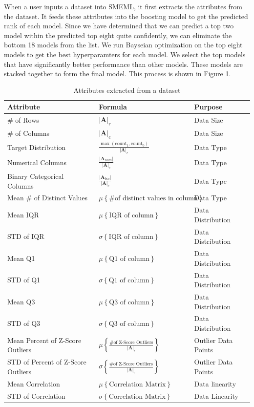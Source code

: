 \documentclass{article}
\begin{document}
When a user inputs a dataset into SMEML, it first extracts the attributes from the dataset. It feeds these attributes into the boosting model to get the predicted rank of each model. Since we have determined that we can predict a top two model within the predicted top eight quite confidently, we can eliminate the bottom 18 models from the list. We run Bayseian optimization on the top eight models to get the best hyperparamters for each model. We select the top models that have significantly better performance than other models. These models are stacked together to form the final model. This process is shown in Figure 1.
\begin{table}
  \caption{Attributes extracted from a dataset}
  \label{model-options-table}
  \centering
  \begin{tabular}{lll}
    \toprule
    Attribute & Formula & Purpose\\
    \midrule
    \# of Rows & $|\mathbf{A}|_r$ & Data Size \\
    \hline
    \# of Columns & $|\mathbf{A}|_c$ & Data Size \\
    \hline
    Target Distribution &
    $\frac{\max(\text{count}_1, \text{count}_0)}{|\mathbf{A}|_r}$
    & Data Type \\
    \hline
    Numerical Columns &
    $\frac{|\mathbf{A}_{num}|}{|\mathbf{A}|_{c}}$
    & Data Type \\
    \hline
    Binary Categorical Columns &
    $\frac{|\mathbf{A}_{bin}|}{|\mathbf{A}|_{c}}$
    & Data Type \\
    \hline
    Mean \# of Distinct Values  & $\mu \left\{\text{\# of distinct values in column}\right\}$ & Data Type \\ 
    \hline
    Mean IQR  & $\mu \left\{\text{IQR of column}\right\}$ & Data Distribution \\ 
    \hline
    STD of IQR  & $\sigma \left\{\text{IQR of column}\right\}$ & Data Distribution \\
    \hline
    Mean Q1 & $\mu \left\{\text{Q1 of column}\right\}$ & Data Distribution \\
    \hline
    STD of Q1  & $\sigma \left\{\text{Q1 of column}\right\}$ & Data Distribution \\
    \hline
    Mean Q3  & $\mu \left\{\text{Q3 of column}\right\}$ & Data Distribution \\
    \hline
    STD of Q3  & $\sigma \left\{\text{Q3 of column}\right\}$ & Data Distribution \\
    \hline
    Mean Percent of Z-Score Outliers  & 
    $\mu \left\{ \frac{\text{\# of Z-Score Outliers}}{|\mathbf{A}|_r} \right\}$ & Outlier Data Points \\
    \hline
    STD of Percent of Z-Score Outliers  &
    $\sigma \left\{ \frac{\text{\# of Z-Score Outliers}}{|\mathbf{A}|_r} \right\}$ & Outlier Data Points \\
    \hline
    Mean Correlation& $\mu \left\{\text{Correlation Matrix}\right\}$ & Data linearity \\
    \hline
    STD of Correlation & $\sigma \left\{\text{Correlation Matrix}\right\}$ & Data Linearity \\
    \bottomrule
  \end{tabular}
\end{table}
\end{document}
